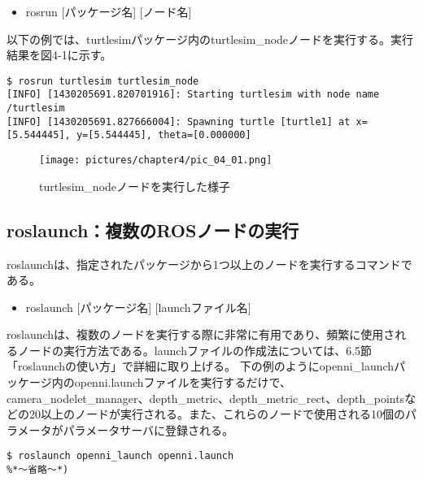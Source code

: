 \begin{itemize}
\item   rosrun [パッケージ名] [ノード名]\\
\end{itemize}

以下の例では、turtlesimパッケージ内のturtlesim\_nodeノードを実行する。実行結果を図4-1に示す。

\begin{lstlisting}[language=ROS]
$ rosrun turtlesim turtlesim_node
[INFO] [1430205691.820701916]: Starting turtlesim with node name /turtlesim
[INFO] [1430205691.827666004]: Spawning turtle [turtle1] at x=[5.544445], y=[5.544445], theta=[0.000000]
\end{lstlisting}

\begin{figure}[h]
  \centering
  \texttt{[image: pictures/chapter4/pic\_04\_01.png]}
  \caption{turtlesim\_nodeノードを実行した様子}
\end{figure}


\subsection{roslaunch：複数のROSノードの実行}

roslaunchは、指定されたパッケージから1つ以上のノードを実行するコマンドである。\\

\begin{itemize}
\item   roslaunch [パッケージ名] [launchファイル名]\\
\end{itemize}

roslaunchは、複数のノードを実行する際に非常に有用であり、頻繁に使用されるノードの実行方法である。launchファイルの作成法については、6.5節「roslaunchの使い方」で詳細に取り上げる。
下の例のようにopenni\_launchパッケージ内のopenni.launchファイルを実行するだけで、camera\_nodelet\_manager、depth\_metric、depth\_metric\_rect、depth\_pointsなどの20以上のノードが実行される。また、これらのノードで使用される10個のパラメータがパラメータサーバに登録される。\\

\begin{lstlisting}[language=ROS]
$ roslaunch openni_launch openni.launch
%*〜省略〜*)
\end{lstlisting}

